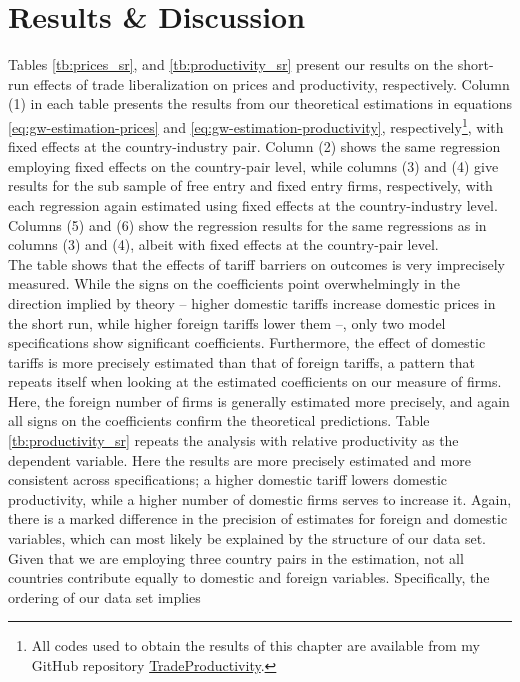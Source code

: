 \section{Results \& Discussion}\label{sec:disc4}
Tables \ref{tb:prices_sr}, and \ref{tb:productivity_sr} present 
our results on the short-run effects of trade liberalization on prices 
and productivity, respectively. Column (1) in each table presents the results from 
our theoretical estimations in equations \ref{eq:gw-estimation-prices} and \ref{eq:gw-estimation-productivity}, 
respectively\footnote{All codes used to obtain the results of this chapter are 
available from my GitHub repository 
\href{https://github.com/nilshg/TradeProductivity}{TradeProductivity}.}, with 
fixed effects at the country-industry pair. Column (2) shows the same regression
employing fixed effects on the country-pair level, while columns (3) and (4) 
give results for the sub sample of free entry and fixed entry firms, respectively, 
with each regression again estimated using fixed effects at the country-industry
level. Columns (5) and (6) show the regression results for the same regressions
as in columns (3) and (4), albeit with fixed effects at the country-pair level. \\
The table shows that the effects of tariff barriers on outcomes is very imprecisely
measured. While the signs on the coefficients point overwhelmingly in the direction
implied by theory -- higher domestic tariffs increase domestic prices in the short
run, while higher foreign tariffs lower them --, only two model specifications
show significant coefficients. Furthermore, the effect of domestic tariffs is
more precisely estimated than that of foreign tariffs, a pattern that repeats
itself when looking at the estimated coefficients on our measure of firms. Here,
the foreign number of firms is generally estimated more precisely, and again all
signs on the coefficients confirm the theoretical predictions. Table \ref{tb:productivity_sr}
repeats the analysis with relative productivity as the dependent variable. Here
the results are more precisely estimated and more consistent across specifications; 
a higher domestic tariff lowers domestic productivity, while a higher number of
domestic firms serves to increase it. Again, there is a marked difference in 
the precision of estimates for foreign and domestic variables, which can most 
likely be explained by the structure of our data set. Given that we are employing
three country pairs in the estimation, not all countries contribute equally to
domestic and foreign variables. Specifically, the ordering of our data set implies
